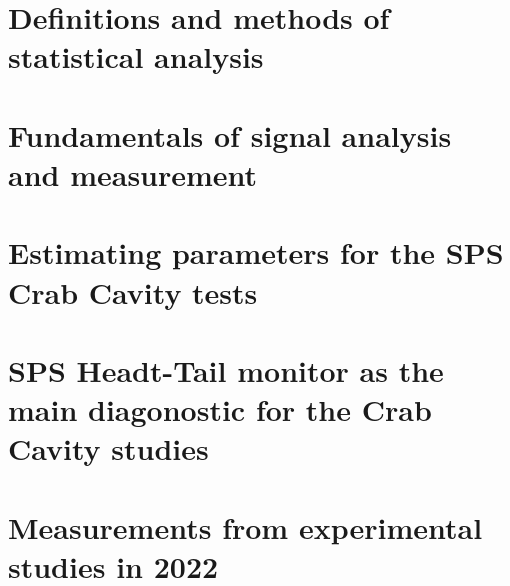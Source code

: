 \documentclass[12pt,twoside]{report} %
\begin{document}
\appendix
\chapter{Definitions and  methods of statistical analysis}\label{ch:app_A}

\chapter{Fundamentals of signal analysis and measurement}\label{ch:app_B}

\chapter{Estimating parameters for the SPS Crab Cavity tests}\label{ch:app_C}

\chapter{SPS Headt-Tail monitor as the main diagonostic for the Crab Cavity studies}\label{ch:app_HT_monitor}

\chapter{Measurements from experimental studies in 2022}\label{ch:app_measurments_22}



\backmatter

\printbibliography
\end{document}
